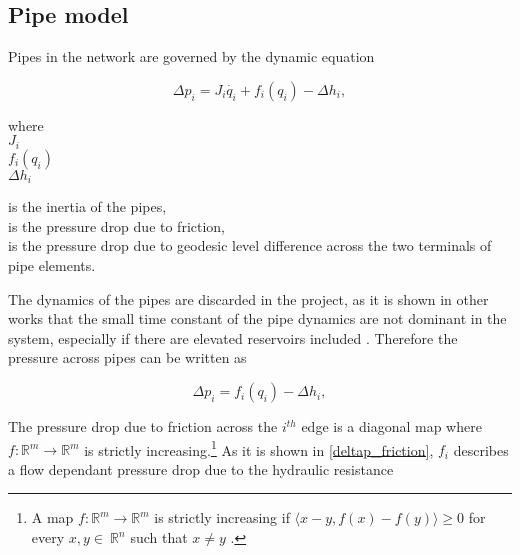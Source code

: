 \subsection{Pipe model}
\label{pipe_component}

Pipes in the network are governed by the dynamic equation

\begin{equation}
\label{complete_pipemodel}
  \Delta p_i = J_i \dot{q_i} + f_i(q_i) - \Delta h_i,
\end{equation}

 \begin{minipage}[t]{0.20\textwidth}
where\\
\hspace*{8mm} $J_i$ \\
\hspace*{8mm} $f_i(q_i)$ \\
\hspace*{8mm} $\Delta h_i$ 
\end{minipage}
\begin{minipage}[t]{0.68\textwidth}
\vspace*{2mm}
is the inertia of the pipes,\\ 
is the pressure drop due to friction,\\
is the pressure drop due to geodesic level difference across the two terminals of pipe elements.
\end{minipage}

The dynamics of the pipes are discarded in the project, as it is shown in other works that the small time constant of the pipe dynamics are not dominant in the system, especially if there are elevated reservoirs included \cite{8thsemester_project,kenneth_houe}. Therefore the pressure across pipes can be written as


\begin{equation}
\label{complete_pipemodel1}
  \Delta p_i = f_i(q_i) - \Delta h_i,
\end{equation}

The pressure drop due to friction across the $i^{th}$ edge is a diagonal map where $f: \mathbb{R}^{m} \rightarrow \mathbb{R}^{m} $ is strictly increasing.\footnote{A map $f: \mathbb{R}^{m} \rightarrow \mathbb{R}^{m} $ is strictly increasing if $\langle x-y, f(x)-f(y) \rangle \geq 0$ for every $x,y \in \: \mathbb{R}^{n}$ such that $x \neq y$ \cite{oneinput_paper}.} As it is shown in \eqref{deltap_friction}, $f_i$ describes a flow dependant pressure drop due to the hydraulic resistance

